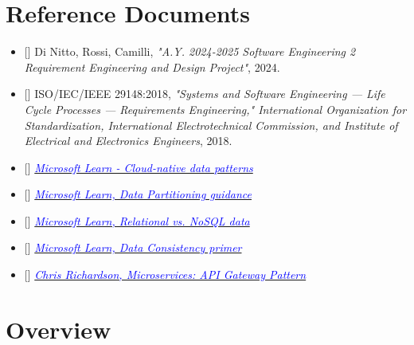 \section{Reference Documents}
\label{sec:reference_documents}
\begin{itemize}
    \item{[\cbib]} Di Nitto, Rossi, Camilli, \textit{"A.Y. 2024-2025 Software Engineering 2 Requirement Engineering and Design Project"}, 2024.
    
    \item{[\cbib]} ISO/IEC/IEEE 29148:2018, \textit{"Systems and Software Engineering — Life Cycle Processes — Requirements Engineering," International Organization for Standardization, International Electrotechnical Commission, and Institute of Electrical and Electronics Engineers}, 2018.

    \item{[\cbib]} \href{https://learn.microsoft.com/en-us/dotnet/architecture/cloud-native/distributed-data#database-per-microservice-why}{\textcolor{blue}{\textit{Microsoft Learn - Cloud-native data patterns}}}
    \label{document: cloud_native_data_patters}
    
    \item{[\cbib]} \href{https://learn.microsoft.com/en-us/previous-versions/msp-n-p/dn589795(v=pandp.10)#functional-partitioning}{\textcolor{blue}{\textit{Microsoft Learn, Data Partitioning guidance}}}
    \label{document: data_partitioning}

    \item{[\cbib]} \href{https://learn.microsoft.com/en-us/dotnet/architecture/cloud-native/relational-vs-nosql-data#the-cap-theorem}{\textcolor{blue}{\textit{Microsoft Learn, Relational vs. NoSQL data}}}
    \label{document: relational_nosql_data}

    \item{[\cbib]} \href{https://learn.microsoft.com/en-us/previous-versions/msp-n-p/dn589800(v=pandp.10)#eventual-consistency}{\textcolor{blue}{\textit{Microsoft Learn, Data Consistency primer}}}
    \label{document: data_consistency}

    \item{[\cbib]} \href{https://microservices.io/patterns/apigateway.html}{\textcolor{blue}{\textit{Chris Richardson, Microservices: API Gateway Pattern}}}
    \label{document: api_gateway}

\end{itemize}

\section{Overview}
